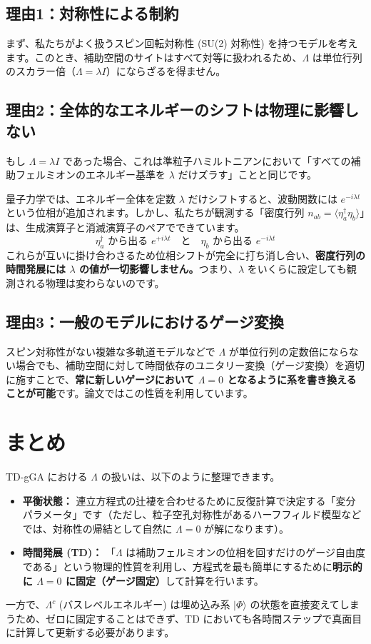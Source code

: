\documentclass[12pt,a4paper]{ltjsarticle}
\begin{document}
\subsection{理由1：対称性による制約}
まず、私たちがよく扱うスピン回転対称性 (SU(2) 対称性) を持つモデルを考えます。このとき、補助空間のサイトはすべて対等に扱われるため、$\Lambda$ は単位行列のスカラー倍（$\Lambda = \lambda I$）にならざるを得ません。

\subsection{理由2：全体的なエネルギーのシフトは物理に影響しない}
もし $\Lambda = \lambda I$ であった場合、これは準粒子ハミルトニアンにおいて「すべての補助フェルミオンのエネルギー基準を $\lambda$ だけズラす」ことと同じです。

量子力学では、エネルギー全体を定数 $\lambda$ だけシフトすると、波動関数には $e^{-i\lambda t}$ という位相が追加されます。しかし、私たちが観測する「密度行列 $n_{ab} = \langle \eta^\dagger_a \eta_b \rangle$」は、生成演算子と消滅演算子のペアでできています。
\begin{equation*}
  \eta^\dagger_a \text{ から出る } e^{+i\lambda t} \quad \text{と} \quad \eta_b \text{ から出る } e^{-i\lambda t}
\end{equation*}
これらが互いに掛け合わさるため位相シフトが完全に打ち消し合い、\textbf{密度行列の時間発展には $\lambda$ の値が一切影響しません。}つまり、$\lambda$ をいくらに設定しても観測される物理は変わらないのです。

\subsection{理由3：一般のモデルにおけるゲージ変換}
スピン対称性がない複雑な多軌道モデルなどで $\Lambda$ が単位行列の定数倍にならない場合でも、補助空間に対して時間依存のユニタリー変換（ゲージ変換）を適切に施すことで、\textbf{常に新しいゲージにおいて $\Lambda = 0$ となるように系を書き換えることが可能}です。論文ではこの性質を利用しています。

\section{まとめ}
TD-gGA における $\Lambda$ の扱いは、以下のように整理できます。

\begin{itemize}
    \item \textbf{平衡状態：} 連立方程式の辻褄を合わせるために反復計算で決定する「変分パラメータ」です（ただし、粒子空孔対称性があるハーフフィルド模型などでは、対称性の帰結として自然に $\Lambda=0$ が解になります）。
    \item \textbf{時間発展 (TD)：} 「$\Lambda$ は補助フェルミオンの位相を回すだけのゲージ自由度である」という物理的性質を利用し、方程式を最も簡単にするために\textbf{明示的に $\Lambda = 0$ に固定（ゲージ固定）}して計算を行います。
\end{itemize}

一方で、$\Lambda^c$ (バスレベルエネルギー) は埋め込み系 $|\Phi\rangle$ の状態を直接変えてしまうため、ゼロに固定することはできず、TD においても各時間ステップで真面目に計算して更新する必要があります。
\end{document}
